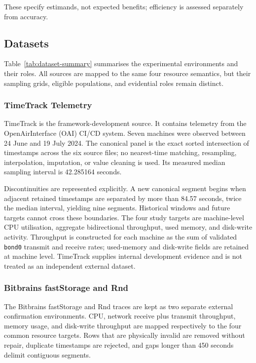\documentclass[a4paper,fleqn]{cas-dc}
\begin{document}
These specify estimands, not expected benefits; efficiency is assessed
separately from accuracy.

\subsection{Datasets}
\label{sec:datasets}

Table~\ref{tab:dataset-summary} summarises the experimental environments and
their roles.  All sources are mapped to the same four resource semantics, but
their sampling grids, eligible populations, and evidential roles remain
distinct.

\subsubsection{TimeTrack Telemetry}
\label{sec:timetrack-data}

TimeTrack is the framework-development source.  It contains telemetry from the
OpenAirInterface (OAI) CI/CD system.  Seven machines were observed between
24 June and 19 July 2024.  The canonical panel
is the exact sorted intersection of timestamps across the six source files; no
nearest-time matching, resampling, interpolation, imputation, or value cleaning
is used.  Its measured median sampling interval is 42.285164 seconds.

Discontinuities are represented explicitly.  A new canonical segment begins
when adjacent retained timestamps are separated by more than 84.57 seconds,
twice the median interval, yielding nine segments.  Historical windows and
future targets cannot cross these boundaries.  The four study targets are
machine-level CPU utilisation, aggregate bidirectional throughput, used memory,
and disk-write activity.  Throughput is constructed for each machine as the sum
of validated \texttt{bond0} transmit and receive rates; used-memory and
disk-write fields are retained at machine level.  TimeTrack supplies internal
development evidence and is not treated as an independent external dataset.

\subsubsection{Bitbrains fastStorage and Rnd}
\label{sec:bitbrains-data}

The Bitbrains fastStorage and Rnd traces are kept as two separate external
confirmation environments.  CPU,
network receive plus transmit throughput, memory usage, and disk-write
throughput are mapped respectively to the four common resource targets.  Rows
that are physically invalid are removed without repair, duplicate timestamps
are rejected, and gaps longer than 450 seconds delimit contiguous segments.
\end{document}
